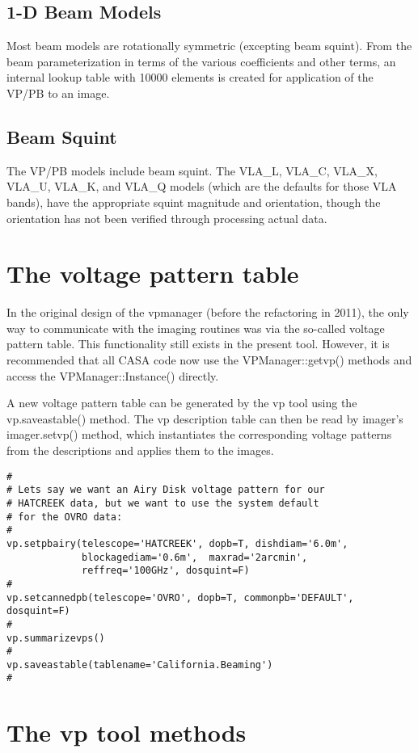 \documentclass[12pt]{article}
\begin{document}
\subsection{1-D Beam Models} 
Most beam models are rotationally symmetric (excepting
beam squint).  From the beam parameterization in terms of the various
coefficients and other terms, an internal lookup table with 10000 elements is
created for application of the VP/PB to an image.

\subsection{Beam Squint} The VP/PB models include beam squint.  The VLA\_L,
VLA\_C, VLA\_X, VLA\_U, VLA\_K, and VLA\_Q models (which are the defaults for
those VLA bands), have the appropriate squint magnitude and orientation, though
the orientation has not been verified through processing actual data.

\section{The voltage pattern table}
\label{secvp}

In the original design of the vpmanager (before the refactoring in 2011),
the only way to communicate with the imaging routines was via the so-called
voltage pattern table. This functionality still exists in the present tool.
However, it is recommended that all CASA code now use the VPManager::getvp()
methods and access the VPManager::Instance() directly.

A new voltage pattern table can be generated by the vp tool using the vp.saveastable()
method.  The vp description table can then be read by imager's
imager.setvp() method, which instantiates the
corresponding voltage patterns from the descriptions and applies them
to the images.


\begin{verbatim}
#
# Lets say we want an Airy Disk voltage pattern for our
# HATCREEK data, but we want to use the system default
# for the OVRO data:
#
vp.setpbairy(telescope='HATCREEK', dopb=T, dishdiam='6.0m',
             blockagediam='0.6m',  maxrad='2arcmin',
             reffreq='100GHz', dosquint=F)
#
vp.setcannedpb(telescope='OVRO', dopb=T, commonpb='DEFAULT', dosquint=F)
#
vp.summarizevps()
#
vp.saveastable(tablename='California.Beaming')
#
\end{verbatim}


\section{The vp tool methods}
\label{secvptoolmethods}
\end{document}

